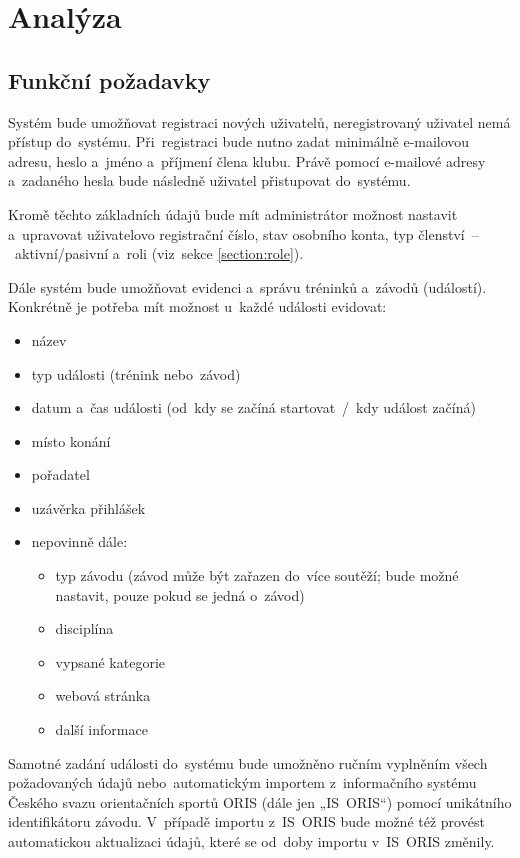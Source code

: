 \chapter{Analýza}
\section{Funkční požadavky}

\begin{enumerate}[label=\textcolor{decoration}{\textbf{F\arabic*}}]
	Systém bude umožňovat registraci nových uživatelů, neregistrovaný uživatel nemá přístup do~systému. Při~registraci bude nutno zadat minimálně e-mailovou adresu, heslo a~jméno a~příjmení člena klubu. Právě pomocí e-mailové adresy a~zadaného hesla bude následně uživatel přistupovat do~systému.

	Kromě těchto základních údajů bude mít administrátor možnost nastavit a~upravovat uživatelovo registrační číslo, stav osobního konta, typ členství~–~aktivní/pasivní a~roli (viz~sekce \ref{section:role}).

	Dále systém bude umožňovat evidenci a~správu tréninků a~závodů (událostí). Konkrétně je potřeba mít možnost u~každé události evidovat:
	\begin{itemize}
		\item název
		\item typ události (trénink nebo~závod)
		\item datum a~čas události (od~kdy se začíná startovat~/~kdy událost začíná)
		\item místo konání
		\item pořadatel
		\item uzávěrka přihlášek
		\item nepovinně dále:
		\begin{itemize}
			\item typ závodu (závod může být zařazen do~více soutěží; bude možné nastavit, pouze pokud se jedná o~závod)
			\item disciplína
			\item vypsané kategorie
			\item webová stránka
			\item další informace
		\end{itemize}
	\end{itemize}

	Samotné zadání události do~systému bude umožněno ručním vyplněním všech požadovaných údajů nebo~automatickým importem z~informačního systému Českého svazu orientačních sportů ORIS (dále jen „IS~ORIS“) pomocí unikátního identifikátoru závodu. V~případě importu z~IS~ORIS bude možné též provést automatickou aktualizaci údajů, které se od~doby importu v~IS~ORIS změnily.


\end{enumerate}
